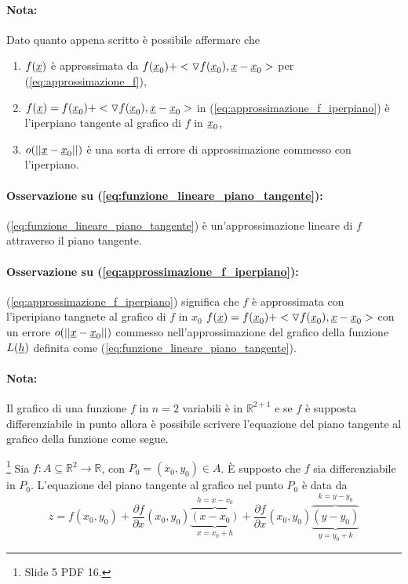 \paragraph{Nota:} Dato quanto appena scritto è possibile affermare che
\begin{enumerate}
	\item $f(\uline x)$ è approssimata da $f(\uline x_0) + <\triangledown f(\uline x_0), \uline x-\uline x_0>$ per (\ref{eq:approssimazione_f}),
	\item $f(\uline x)=f(\uline x_0) + <\triangledown f(\uline x_0), \uline x-\uline x_0>$ in (\ref{eq:approssimazione_f_iperpiano}) è l'iperpiano tangente al grafico di $f$ in $\uline x_0$,
	\item $o(||\uline x - \uline x_0||)$ è una sorta di errore di approssimazione commesso con l'iperpiano.
\end{enumerate}

\paragraph{Osservazione su (\ref{eq:funzione_lineare_piano_tangente}):} (\ref{eq:funzione_lineare_piano_tangente}) è un'approssimazione lineare di $f$ attraverso il piano tangente.

\paragraph{Osservazione su (\ref{eq:approssimazione_f_iperpiano}):} (\ref{eq:approssimazione_f_iperpiano}) significa che $f$ è approssimata con l'iperipiano tangnete al grafico di $f$ in $x_0$ $f(\uline x)=f(\uline x_0) + <\triangledown f(\uline x_0), \uline x-\uline x_0>$ con un errore $o(||\uline x- \uline x_0||)$ commesso nell'approssimazione del grafico della funzione $L(\uline h)$ definita come (\ref{eq:funzione_lineare_piano_tangente}).

\paragraph{Nota:} Il grafico di una funzione $f$ in $n=2$ variabili è in $\mathbb{R}^{2+1}$ e se $f$ è supposta differenziabile in punto allora è possibile scrivere l'equazione del piano tangente al grafico della funzione come segue.

\begin{definition}[Piano tangente al grafico di una funzione (con $n=2$)]\footnote{Slide 5 PDF 16.}
	Sia $f:A\subseteq \mathbb{R}^2\rightarrow\mathbb{R}$, con $P_0=(x_0,y_0)\in A$. È supposto che $f$ sia differenziabile in $P_0$. L'equazione del piano tangente al grafico nel punto $P_0$ è data da
	\begin{equation}\label{eq:piano_tangente_grafico_due_variabili}
			z=f(x_0, y_0) + \frac{\partial f}{\partial x} (x_0, y_0) \overbrace{\underbrace{(x-x_0)}_{x = x_0 + h} }^{h=x-x_0}+ \frac{\partial f}{\partial x} (x_0,y_0) \overbrace{\underbrace{(y-y_0)}_{y=y_0+k}}^{k=y-y_0}
	\end{equation}
\end{definition}

